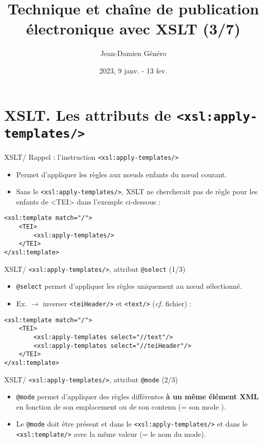 \documentclass{beamer}
\title{Technique et chaîne de publication électronique avec XSLT (3/7)}
\date{2023, 9 janv. - 13 fev.}
\author{Jean-Damien Généro}
\institute{École nationale des chartes -- M2 TNAH}
\begin{document}
    \maketitle

    \section{XSLT. Les attributs de \texttt{<xsl:apply-templates/>}}

    \begin{frame}[fragile]{XSLT/ Rappel : l'instruction \texttt{<xsl:apply-templates/>}}
        \Large
        \begin{itemize}
            \item Permet d'appliquer les règles aux n\oe uds enfants du n\oe ud courant.
            \item Sans le \texttt{<xsl:apply-templates/>}, XSLT ne chercherait pas de règle pour les enfants de <TEI> dans l'exemple ci-dessous :
        \end{itemize}
        \begin{verbatim}
<xsl:template match="/">
    <TEI>
        <xsl:apply-templates/>
    </TEI>
</xsl:template>
        \end{verbatim}
    \end{frame}

    \begin{frame}[fragile]{XSLT/ \texttt{<xsl:apply-templates/>}, attribut \texttt{@select} (1/3)}
        \Large
        \begin{itemize}
            \item \texttt{@select} permet d'appliquer les règles uniquement au n\oe ud sélectionné.
            \bigskip
            \item Ex. $\rightarrow$ inverser \texttt{<teiHeader/>} et \texttt{<text/>} (\textit{cf.} fichier) : 
        \end{itemize}
        \normalsize
        \begin{verbatim}
<xsl:template match="/">
    <TEI>
        <xsl:apply-templates select="//text"/>
        <xsl:apply-templates select="//teiHeader"/>
    </TEI>
</xsl:template>
        \end{verbatim}
    \end{frame}

    \begin{frame}{XSLT/ \texttt{<xsl:apply-templates/>}, attribut \texttt{@mode} (2/3)}
        \Large
        \begin{itemize}
            \item \texttt{@mode} permet d'appliquer des règles différentes \textbf{à un même élément XML} en fonction de son emplacement ou de son contenu (= son \og mode \fg).
            \bigskip
            \item Le \texttt{@mode} doit être présent et dans le \texttt{<xsl:apply-templates/>} et dans le \texttt{<xsl:template/>} avec la même valeur (= le nom du mode).
        \end{itemize}
    \end{frame}
\end{document}
